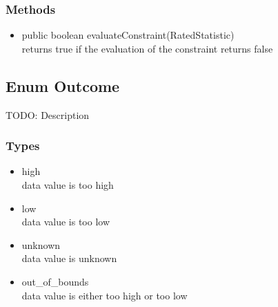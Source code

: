 \subsubsection{Methods}
\begin{itemize}
	\item public boolean evaluateConstraint(RatedStatistic)\\
	returns true if the evaluation of the constraint returns false
\end{itemize}

\subsection{Enum Outcome }
TODO: Description

\subsubsection{Types}
\begin{itemize}
	\item high\\
	data value is too high
	\item low\\
	data value is too low
	\item unknown\\
	data value is unknown
	\item out\_of\_bounds\\
	data value is either too high or too low
\end{itemize}
